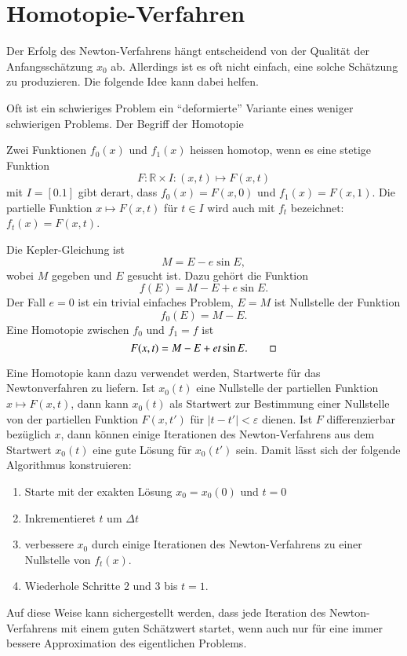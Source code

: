 %
%
%
\section{Homotopie-Verfahren
\label{buch:section:homotopie}}
Der Erfolg des Newton-Verfahrens hängt entscheidend von der Qualität der
Anfangsschätzung $x_0$ ab.
Allerdings ist es oft nicht einfach, eine solche Schätzung zu produzieren.
Die folgende Idee kann dabei helfen.

Oft ist ein schwieriges Problem ein ``deformierte'' Variante eines
weniger schwierigen Problems.
Der Begriff der Homotopie 

\begin{definition}
Zwei Funktionen $f_0(x)$ und $f_1(x)$ heissen homotop, wenn es
eine stetige Funktion
\[
F\colon \mathbb R\times I : (x,t)\mapsto F(x,t)
\]
mit $I=[0.1]$
gibt derart, dass $f_0(x)=F(x,0)$ und $f_1(x)=F(x,1)$.
Die partielle Funktion $x\mapsto F(x,t)$ für $t\in I$ wird auch mit
$f_t$ bezeichnet: $f_t(x)=F(x,t)$.
\end{definition}

\begin{beispiel}
Die Kepler-Gleichung ist 
\[
M=E-e\sin E,
\]
wobei $M$ gegeben und $E$ gesucht ist.
Dazu gehört die Funktion
\[
f(E)=M-E+e\sin E.
\]
Der Fall $e=0$ ist ein trivial einfaches Problem, $E=M$ ist Nullstelle
der Funktion
\[
f_0(E)=M-E.
\]
Eine Homotopie zwischen $f_0$ und $f_1=f$ ist
\[
F(x,t) = M-E+et\sin E.
\qedhere
\]
\end{beispiel}

Eine Homotopie kann dazu verwendet werden, Startwerte für das Newtonverfahren
zu liefern.
Ist $x_0(t)$ eine Nullstelle der partiellen Funktion $x\mapsto F(x,t)$,
dann kann $x_0(t)$ als Startwert zur Bestimmung einer Nullstelle von
der partiellen Funktion $F(x,t')$ für $|t-t'|<\varepsilon$ dienen.
Ist $F$ differenzierbar bezüglich $x$, dann können einige Iterationen
des Newton-Verfahrens aus dem Startwert $x_0(t)$ eine gute Lösung für
$x_0(t')$ sein.
Damit lässt sich der folgende Algorithmus konstruieren:

\begin{enumerate}
\item 
Starte mit der exakten Lösung $x_0=x_0(0)$ und $t=0$
\item
Inkrementieret $t$ um $\Delta t$
\item
verbessere $x_0$ durch einige Iterationen des Newton-Verfahrens
zu einer Nullstelle von $f_t(x)$.
\item 
Wiederhole Schritte 2 und 3 bis $t=1$.
\end{enumerate}
Auf diese Weise kann sichergestellt werden, dass jede Iteration
des Newton-Verfahrens mit einem guten Schätzwert startet, wenn auch
nur für eine immer bessere Approximation des eigentlichen Problems.







